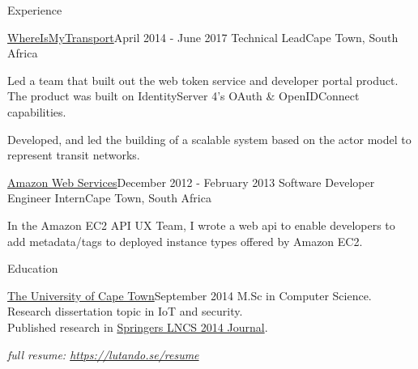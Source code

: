 \documentclass{resume} %
\begin{document}
\begin{rSection}{Experience}
\begin{rSubsection}
        \end{rSubsection}

        \begin{rSubsection}
            {\href{https://www.whereismytransport.com/}{WhereIsMyTransport}}{April 2014 - June 2017}
            {Technical Lead}{Cape Town, South Africa}
            
            \item Led a team that built out the web token service and developer portal product.
                The product was built on IdentityServer 4's OAuth \& OpenIDConnect capabilities.
            
            \item Developed, and led the building of a scalable system based on the actor model to represent transit
            networks.
                
        \end{rSubsection}

        \begin{rSubsection}
            {\href{https://aws.amazon.com/}{Amazon Web Services}}{December 2012 - February 2013}
            {Software Developer Engineer Intern}{Cape Town, South Africa}
            
            \item In the Amazon EC2 API UX Team, I wrote a web api to enable 
                developers to add metadata/tags to deployed instance types offered by Amazon EC2.
                
        \end{rSubsection}

    \end{rSection}

    
    \begin{rSection}{Education}


        \begin{rSubsection}
            {\href{http://www.uct.ac.za/}{The University of Cape Town}}{September 2014}{}{}
            M.Sc in Computer Science. Research dissertation topic in IoT and security. \\
            Published research in \href{https://link.springer.com/chapter/10.1007/978-3-319-13174-0_12}{Springers LNCS 2014 Journal}. \\
                \begin{center}
                    \textit{full resume: \url{https://lutando.se/resume}}
                \end{center}
        \end{rSubsection}

    \end{rSection}
\end{document}
